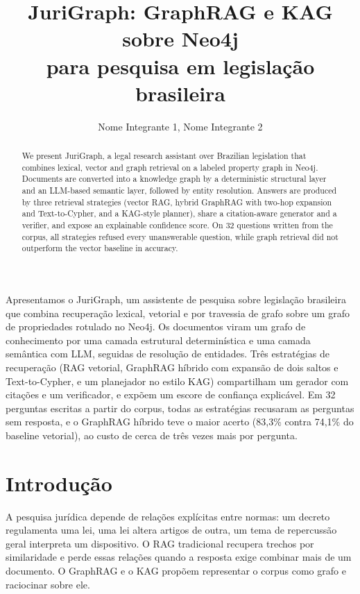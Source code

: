 \documentclass[12pt]{article}
\title{JuriGraph: GraphRAG e KAG sobre Neo4j\\para pesquisa em legislação brasileira}
\author{Nome Integrante 1\inst{1}, Nome Integrante 2\inst{1}}
\begin{document}
\maketitle

\begin{abstract}
We present JuriGraph, a legal research assistant over Brazilian legislation that combines lexical, vector and
graph retrieval on a labeled property graph in Neo4j. Documents are converted into a knowledge graph by a
deterministic structural layer and an LLM-based semantic layer, followed by entity resolution. Answers are
produced by three retrieval strategies (vector RAG, hybrid GraphRAG with two-hop expansion and Text-to-Cypher,
and a KAG-style planner), share a citation-aware generator and a verifier, and expose an explainable confidence
score. On 32 questions written from the corpus, all strategies refused every unanswerable question, while graph
retrieval did not outperform the vector baseline in accuracy.
\end{abstract}

\begin{resumo}
Apresentamos o JuriGraph, um assistente de pesquisa sobre legislação brasileira que combina recuperação
lexical, vetorial e por travessia de grafo sobre um grafo de propriedades rotulado no Neo4j. Os documentos
viram um grafo de conhecimento por uma camada estrutural determinística e uma camada semântica com LLM,
seguidas de resolução de entidades. Três estratégias de recuperação (RAG vetorial, GraphRAG híbrido com
expansão de dois saltos e Text-to-Cypher, e um planejador no estilo KAG) compartilham um gerador com
citações e um verificador, e expõem um escore de confiança explicável. Em 32 perguntas escritas a partir do corpus,
todas as estratégias recusaram as perguntas sem resposta, e o GraphRAG híbrido teve o maior acerto
(83,3\% contra 74,1\% do baseline vetorial), ao custo de cerca de três vezes mais por pergunta.
\end{resumo}

\section{Introdução}

A pesquisa jurídica depende de relações explícitas entre normas: um decreto regulamenta uma lei, uma lei altera
artigos de outra, um tema de repercussão geral interpreta um dispositivo. O RAG tradicional
\cite{lewis2020rag} recupera trechos por similaridade e perde essas relações quando a resposta exige combinar
mais de um documento. O GraphRAG \cite{edge2024graphrag} e o KAG \cite{liang2024kag} propõem representar o
corpus como grafo e raciocinar sobre ele.
\end{document}
